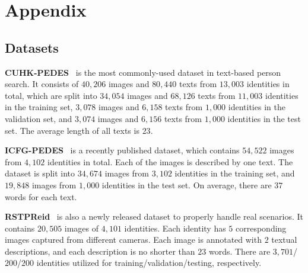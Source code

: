 \documentclass{article}
\begin{document}





\appendix
\section{Appendix}

\subsection{Datasets}
\label{datasets}
\textbf{CUHK-PEDES}~\cite{li2017person} is the most commonly-used dataset in text-based person search. It consists of $40,206$ images and $80,440$ texts from $13,003$ identities in total, which are split into $34,054$ images and $68,126$ texts from $11,003$ identities in the training set, $3,078$ images and $6,158$ texts from $1,000$ identities in the validation set, and $3,074$ images and $6,156$ texts from $1,000$ identities in the test set. The average length of all texts is $23$. 

\noindent\textbf{ICFG-PEDES}~\cite{ding2021semantically} is a recently published dataset, which contains $54,522$ images from $4,102$ identities in total. Each of the images is described by one text. The dataset is split into $34,674$ images from $3,102$ identities in the training set, and $19,848$ images from $1,000$ identities in the test set. On average, there are $37$ words for each text.

\noindent\textbf{RSTPReid}~\cite{zhu2021dssl} is also a newly released dataset to properly handle real scenarios. It contains $20,505$ images of $4,101$ identities. Each identity has $5$ corresponding images captured from different cameras. Each image is annotated with $2$ textual descriptions, and each description is no shorter than $23$ words. There are $3,701$/$200$/$200$ identities utilized for training/validation/testing, respectively.
\end{document}
